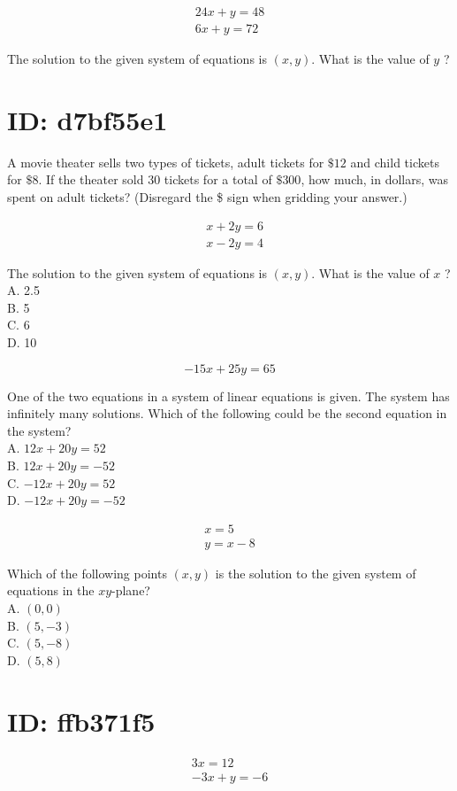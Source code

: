$$
\begin{gathered}
24 x+y=48 \\
6 x+y=72
\end{gathered}
$$

The solution to the given system of equations is $(x, y)$. What is the value of $y$ ?

\section*{ID: d7bf55e1}
A movie theater sells two types of tickets, adult tickets for $\$ 12$ and child tickets for $\$ 8$. If the theater sold 30 tickets for a total of $\$ 300$, how much, in dollars, was spent on adult tickets? (Disregard the \$ sign when gridding your answer.)

$$
\begin{aligned}
& x+2 y=6 \\
& x-2 y=4
\end{aligned}
$$

The solution to the given system of equations is $(x, y)$. What is the value of $x$ ?\\
A. 2.5\\
B. 5\\
C. 6\\
D. 10

$$
-15 x+25 y=65
$$

One of the two equations in a system of linear equations is given. The system has infinitely many solutions. Which of the following could be the second equation in the system?\\
A. $12 x+20 y=52$\\
B. $12 x+20 y=-52$\\
C. $-12 x+20 y=52$\\
D. $-12 x+20 y=-52$

$$
\begin{gathered}
x=5 \\
y=x-8
\end{gathered}
$$

Which of the following points $(x, y)$ is the solution to the given system of equations in the $x y$-plane?\\
A. $(0,0)$\\
B. $(5,-3)$\\
C. $(5,-8)$\\
D. $(5,8)$

\section*{ID: ffb371f5}
$$
\begin{gathered}
3 x=12 \\
-3 x+y=-6
\end{gathered}
$$

